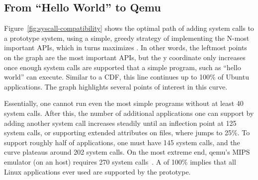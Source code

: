 

\subsection{From ``Hello World'' to Qemu}
\label{sec:observation:hello}

Figure~\ref{fig:syscall-compatibility} shows the optimal path of adding system calls to a prototype system,
using a simple, greedy strategy of implementing the N-most important APIs, which in turns
maximizes \compatmetric{}.
In other words, the leftmost points on the graph are the most important APIs,
but the y coordinate only increases once enough system calls
are supported that a simple program, such as ``hello world'' can execute. %
Similar to a CDF, this line
continues up to 100\% of Ubuntu applications.  The graph highlights several 
points of interest in this curve.

Essentially, one cannot run even the most simple programs without at least 40 system calls.
After this, the number of additional applications one can support by adding another system call increases
steadily until an inflection point at 125 system calls, or supporting extended attributes on files,
where \compatmetric{} jumps to 25\%.
To support roughly half of \osdist{} applications, one must have 145 system calls, and
the curve plateaus around 202 system calls.  
On the most extreme end, qemu's MIPS emulator (on an \osarch{} host) requires 270 system calls~\citep{Bellard05}.
A \compatmetric{} of 100\% implies that
all Linux applications ever used
are supported by the prototype.

